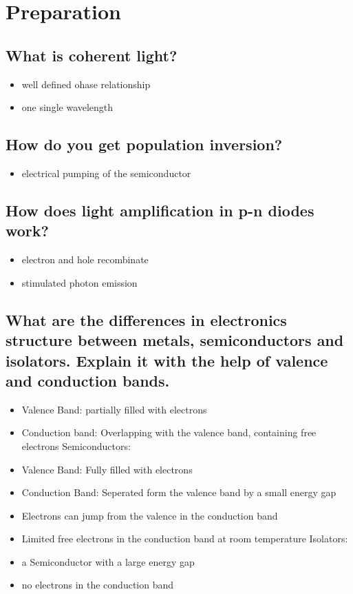 \section{Preparation}
\subsection{What is coherent light?}
\begin{itemize}
    \item well defined ohase relationship
    \item one single wavelength
\end{itemize}

\subsection{How do you get population inversion?}
\begin{itemize}
    \item electrical pumping of the semiconductor
\end{itemize}

\subsection{How does light amplification in p-n diodes work?}
\begin{itemize}
    \item electron and hole recombinate 
    \item stimulated photon emission
\end{itemize}

\subsection{What are the differences in electronics structure 
between metals, semiconductors and isolators. Explain it with 
the help of valence and conduction bands.}
\begin{itemize}
    Metals:
    \item Valence Band: partially filled with electrons
    \item Conduction band: Overlapping with the valence band, containing free electrons
    Semiconductors:
    \item Valence Band: Fully filled with electrons
    \item Conduction Band: Seperated form the valence band by a small energy gap
    \item Electrons can jump from the valence in the conduction band
    \item Limited free electrons in the conduction band at room temperature
    Isolators:
    \item a Semiconductor with a large energy gap
    \item no electrons in the conduction band 
\end{itemize}

